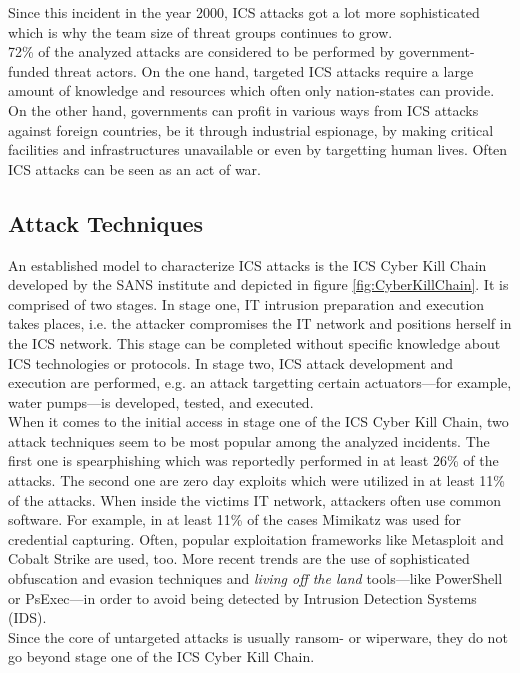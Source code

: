 \documentclass[runningheads]{llncs}
\begin{document}
Since this incident in the year 2000, ICS attacks got a lot more sophisticated which is why the team size of threat groups continues to grow.\\
72\% of the analyzed attacks are considered to be performed by government-funded threat actors.
On the one hand, targeted ICS attacks require a large amount of knowledge and resources which often only nation-states can provide.
On the other hand, governments can profit in various ways from ICS attacks against foreign countries, be it through industrial espionage, by making critical facilities and infrastructures unavailable or even by targetting human lives.
Often ICS attacks can be seen as an act of war. %

\subsection{Attack Techniques}
An established model to characterize ICS attacks is the ICS Cyber Kill Chain developed by the SANS institute and depicted in figure \ref{fig:CyberKillChain}.
It is comprised of two stages.
In stage one, IT intrusion preparation and execution takes places, i.e. the attacker compromises the IT network and positions herself in the ICS network.
This stage can be completed without specific knowledge about ICS technologies or protocols.
In stage two, ICS attack development and execution are performed, e.g. an attack targetting certain actuators---for example, water pumps---is developed, tested, and executed.\\
When it comes to the initial access in stage one of the ICS Cyber Kill Chain, two attack techniques seem to be most popular among the analyzed incidents.
The first one is spearphishing which was reportedly performed in at least 26\% of the attacks.
The second one are zero day exploits which were utilized in at least 11\% of the attacks.
When inside the victims IT network, attackers often use common software.
For example, in at least 11\% of the cases Mimikatz was used for credential capturing.
Often, popular exploitation frameworks like Metasploit and Cobalt Strike are used, too.
More recent trends are the use of sophisticated obfuscation and evasion techniques and \textit{living off the land} tools---like PowerShell or PsExec---in order to avoid being detected by Intrusion Detection Systems (IDS).\\
Since the core of untargeted attacks is usually ransom- or wiperware, they do not go beyond stage one of the ICS Cyber Kill Chain.
\end{document}
